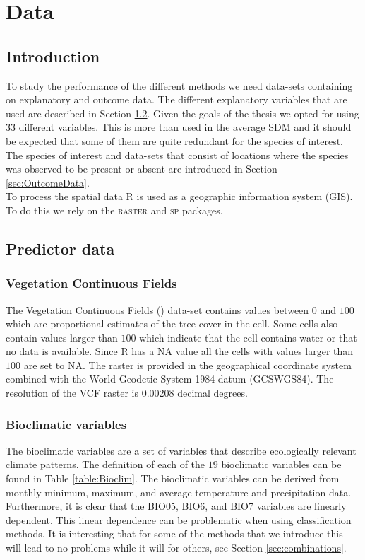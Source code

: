 \chapter{Data}
\label{ch:DataCommonlyUsedInSpeciesDistributionModels}

\section{Introduction}
To study the performance of the different methods we need data-sets containing on explanatory and outcome data. The different explanatory variables that are used are described in Section \ref{sec:PredictorData}. Given the goals of the thesis we opted for using $33$ different variables. This is more than used in the average SDM and it should be expected that some of them are quite redundant for the species of interest. The species of interest and data-sets that consist of locations where the species was observed to be present or absent are introduced in Section \ref{sec:OutcomeData}.  \\

To process the spatial data R \parencite{RProg} is used as a geographic information system (GIS). To do this we rely on the \textsc{raster} \parencite{raster} and \textsc{sp} \parencite{sp} packages.
\section{Predictor data}
\label{sec:PredictorData}

\subsection{Vegetation Continuous Fields}
The Vegetation Continuous Fields () data-set contains values between $0$ and $100$ which are proportional estimates of the tree cover in the cell. Some cells also contain values larger than $100$ which indicate that the cell contains water or that no data is available. Since R has a \textsc{NA} value all the cells with values larger than $100$ are set to \textsc{NA}. The raster is provided in the geographical coordinate system combined with the World Geodetic System 1984 datum (GCS\textunderscore WGS84). The resolution of the VCF raster is $0.00208$ decimal degrees.

\subsection{Bioclimatic variables}
The bioclimatic variables are a set of variables that describe ecologically relevant climate patterns.  The definition of each of the $19$ bioclimatic variables can be found in Table \ref{table:Bioclim}. The bioclimatic variables can be derived from monthly minimum, maximum, and average temperature and precipitation data. Furthermore, it is clear that the BIO05, BIO6, and BIO7 variables are linearly dependent. This linear dependence can be problematic when using classification methods. It is interesting that for some of the methods that we introduce this will lead to no problems while it will for others, see Section \ref{sec:combinations}. \\ 

